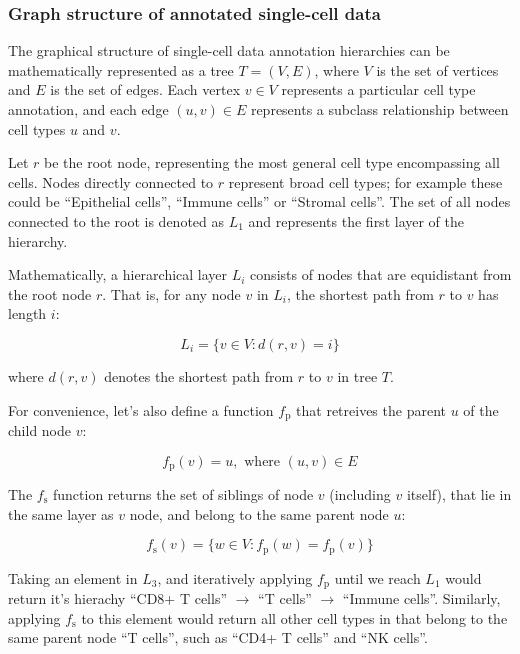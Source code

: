 \subsubsection*{Graph structure of annotated single-cell data}

The graphical structure of single-cell data annotation hierarchies can be mathematically represented as a tree $T = (V, E)$, where $V$ is the set of vertices and $E$ is the set of edges. Each vertex $v \in V$ represents a particular cell type annotation, and each edge $(u, v) \in E$ represents a subclass relationship between cell types $u$ and $v$. 

Let $r$ be the root node, representing the most general cell type encompassing all cells. Nodes directly connected to $r$ represent broad cell types; for example these could be ``Epithelial cells'', ``Immune cells'' or ``Stromal cells''. The set of all nodes connected to the root is denoted as $L_1$ and represents the first layer of the hierarchy. 

Mathematically, a hierarchical layer $L_i$ consists of nodes that are equidistant from the root node $r$. That is, for any node $v$ in $L_i$, the shortest path from $r$ to $v$ has length $i$:

\begin{equation}
    L_i = \{v \in V : d(r, v) = i\}
\end{equation}

where $d(r,v)$ denotes the shortest path from $r$ to $v$ in tree $T$. 

For convenience, let's also define a function $f_{\text{p}}$  that retreives the parent $u$ of the child node $v$:

\begin{equation}
    f_{\text{p}}(v) = u, \text{ where } (u, v) \in E
\end{equation}

The $f_{\text{s}}$ function  returns the set of siblings of node $v$ (including $v$ itself), that lie in the same layer as $v$ node, and belong to the same parent node $u$:

\begin{equation}
    f_{\text{s}}(v) = \{w \in V : f_{\text{p}}(w) = f_{\text{p}}(v)\}
\end{equation}

Taking an element in $L_3$, and iteratively applying $f_{\text{p}}$ until we reach $L_1$  would return it's hierachy ``CD8+ T cells'' $\rightarrow$ ``T cells'' $\rightarrow$ ``Immune cells''. Similarly, applying $f_{\text{s}}$ to this element would return all other cell types in that belong to the same parent node ``T cells'', such as ``CD4+ T cells'' and ``NK cells''.

